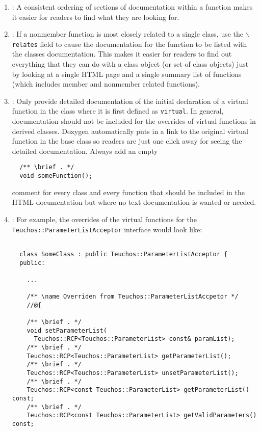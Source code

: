 \begin{enumerate}
{}\item\DOXOrderOfDocFieds: A consistent ordering of sections of documentation
within a function makes it easier for readers to find what they are looking
for.

{}\item\DOXUseRelatesForNonmemberFunctions: If a nonmember function is most
closely related to a single class, use the {}\texttt{$\backslash$relates}
field to cause the documentation for the function to be listed with the
classes documentation.  This makes it easier for readers to find out
everything that they can do with a class object (or set of class objects) just
by looking at a single HTML page and a single summary list of functions (which
includes member and nonmember related functions).

{}\item\DOXDocumentInitialVirtualOnly: Only provide detailed documentation of
the initial declaration of a virtual function in the class where it is first
defined as {}\texttt{virtual}.  In general, documentation should not be
included for the overrides of virtual functions in derived classes.  Doxygen
automatically puts in a link to the original virtual function in the base
class so readers are just one click away for seeing the detailed
documentation.  Always add an empty
%
{\small\begin{verbatim}
  /** \brief . */
  void someFunction();
\end{verbatim}}
%
comment for every class and every function that should be included in the HTML
documentation but where no text documentation is wanted or needed.

{}\item\DOXAggregateOverrides: For example, the overrides of the virtual
functions for the {}\texttt{Teuchos\-::Parameter\-List\-Acceptor} interface
would look like:

{\small\begin{verbatim}

  class SomeClass : public Teuchos::ParameterListAcceptor {
  public:

    ...

    /** \name Overriden from Teuchos::ParameterListAccpetor */
    //@{

    /** \brief . */
    void setParameterList(
      Teuchos::RCP<Teuchos::ParameterList> const& paramList);
    /** \brief . */
    Teuchos::RCP<Teuchos::ParameterList> getParameterList();
    /** \brief . */
    Teuchos::RCP<Teuchos::ParameterList> unsetParameterList();
    /** \brief . */
    Teuchos::RCP<const Teuchos::ParameterList> getParameterList() const;
    /** \brief . */
    Teuchos::RCP<const Teuchos::ParameterList> getValidParameters() const;


\end{verbatim}}
\end{enumerate}

